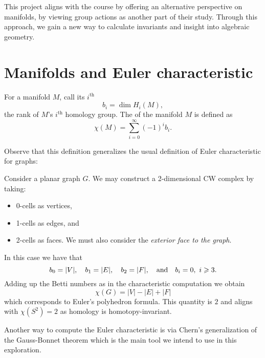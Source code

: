\documentclass[12pt]{memoir}
\begin{document}
    This project aligns with the course by offering an alternative perspective on manifolds, by viewing group actions as another part of their study. Through this approach, we gain a new way to calculate invariants and insight into algebraic geometry.
    
\section{Manifolds and Euler characteristic}


\begin{Def}
For a manifold $M$, call its $i^{\text{th}}$ 
$$b_i=\dim H_i(M),$$
the rank of $M$'s $i^{\text{th}}$ homology group.
The  of the manifold $M$ is defined as 
$$\chi(M)=\sum_{i=0}^\infty(-1)^ib_i.$$
\end{Def}

Observe that this definition generalizes the usual definition of Euler characteristic for graphs:

\begin{Ex}
    Consider a planar graph $G$. We may construct a 2-dimensional CW complex by taking:
    \begin{itemize}
        \item 0-cells as vertices,
        \item 1-cells as edges, and
        \item 2-cells as faces. We must also consider the \emph{exterior face to the graph}.
    \end{itemize} 
    In this case we have that 
    $$b_0=|V|,\quad b_1=|E|,\quad b_2=|F|,\quad\text{and}\quad b_i=0,\ i\geqslant 3.$$
    Adding up the Betti numbers as in the characteristic computation we obtain 
    $$\chi(G)=|V|-|E|+|F|$$
    which corresponds to Euler's polyhedron formula. This quantity is $2$ and aligns with $\chi(S^2)=2$ as homology is homotopy-invariant.
\end{Ex}


Another way to compute the Euler characteristic is via Chern's generalization of the Gauss-Bonnet theorem which is the main tool we intend to use in this exploration.
\end{document}
